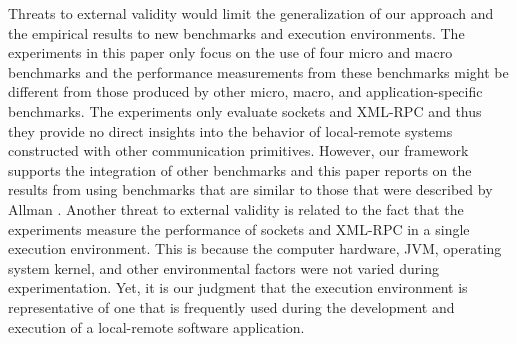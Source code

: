 \documentclass{sig-alternate}
\begin{document}
Threats to external validity would limit the generalization of our
approach and the empirical results to new benchmarks and execution
environments.  The experiments in this paper only focus on the use of
four micro and macro benchmarks and the performance measurements from
these benchmarks might be different from those produced by other
micro, macro, and application-specific benchmarks.  The experiments
only evaluate sockets and XML-RPC and thus they provide no direct
insights into the behavior of local-remote systems constructed with
other communication primitives.  However, our framework supports the
integration of other benchmarks and this paper reports on the results
from using benchmarks that are similar to those that were described by
Allman \cite{allman-per}.  Another threat to external validity is
related to the fact that the experiments measure the performance of
sockets and XML-RPC in a single execution environment. This is because
the computer hardware, JVM, operating system kernel, and other
environmental factors were not varied during experimentation.  Yet, it
is our judgment that the execution environment is representative of
one that is frequently used during the development and execution of a
local-remote software application.
\end{document}
